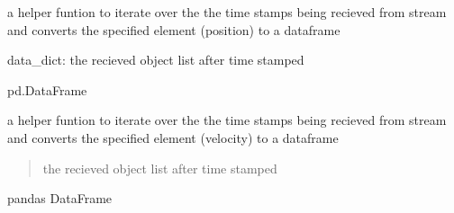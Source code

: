 \documentclass[letterpaper,10pt,english]{sphinxmanual}
\begin{document}

\begin{fulllineitems}
\label{\detokenize{processing:processing.utils.get_pos_df}}
\pysigstartsignatures
{}
\pysigstopsignatures\begin{description}
\sphinxAtStartPar
a helper funtion to iterate over the the time stamps being recieved from stream
and converts the specified element (position) to a dataframe

\sphinxAtStartPar
data\_dict: the recieved object list after time stamped

\sphinxAtStartPar
pd.DataFrame

\end{description}

\end{fulllineitems}


\begin{fulllineitems}
\label{\detokenize{processing:processing.utils.get_vel_df}}
\pysigstartsignatures
{}
\pysigstopsignatures\begin{description}
\sphinxAtStartPar
a helper funtion to iterate over the the time stamps being recieved from stream
and converts the specified element (velocity) to a dataframe

\begin{quote}\begin{description}
\sphinxAtStartPar
the recieved object list after time stamped

\end{description}\end{quote}

\sphinxAtStartPar
pandas DataFrame

\end{description}

\end{fulllineitems}
\end{document}
